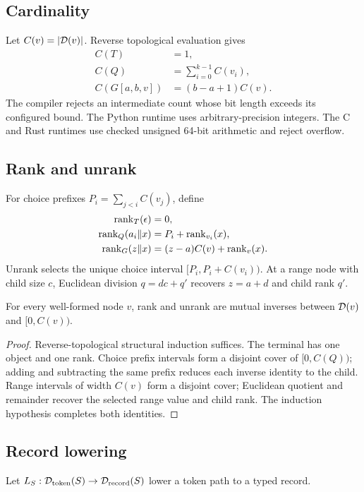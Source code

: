 \subsection{Cardinality}
Let \(C(v)=|\mathcal{D}(v)|\). Reverse topological evaluation gives
\begin{align}
C(T)&=1,\\
C(Q)&=\sum_{i=0}^{k-1}C(v_i),\\
C(G[a,b,v])&=(b-a+1)C(v).
\end{align}
The compiler rejects an intermediate count whose bit length exceeds its configured bound. The Python runtime uses arbitrary-precision integers. The C and Rust runtimes use checked unsigned 64-bit arithmetic and reject overflow.

\subsection{Rank and unrank}
For choice prefixes \(P_i=\sum_{j<i}C(v_j)\), define
\begin{align}
\operatorname{rank}_T(\epsilon)&=0,\\
\operatorname{rank}_Q(a_i\Vert x)&=P_i+\operatorname{rank}_{v_i}(x),\\
\operatorname{rank}_G(z\Vert x)&=(z-a)C(v)+\operatorname{rank}_v(x).
\end{align}
Unrank selects the unique choice interval \([P_i,P_i+C(v_i))\). At a range node with child size \(c\), Euclidean division \(q=dc+q'\) recovers \(z=a+d\) and child rank \(q'\).

\begin{theorem}
For every well-formed node \(v\), rank and unrank are mutual inverses between \(\mathcal{D}(v)\) and \([0,C(v))\).
\end{theorem}
\begin{proof}
Reverse-topological structural induction suffices. The terminal has one object and one rank. Choice prefix intervals form a disjoint cover of \([0,C(Q))\); adding and subtracting the same prefix reduces each inverse identity to the child. Range intervals of width \(C(v)\) form a disjoint cover; Euclidean quotient and remainder recover the selected range value and child rank. The induction hypothesis completes both identities.
\end{proof}

\subsection{Record lowering}
Let \(L_S:\mathcal{D}_{\mathrm{token}}(S)\rightarrow\mathcal{D}_{\mathrm{record}}(S)\) lower a token path to a typed record.

